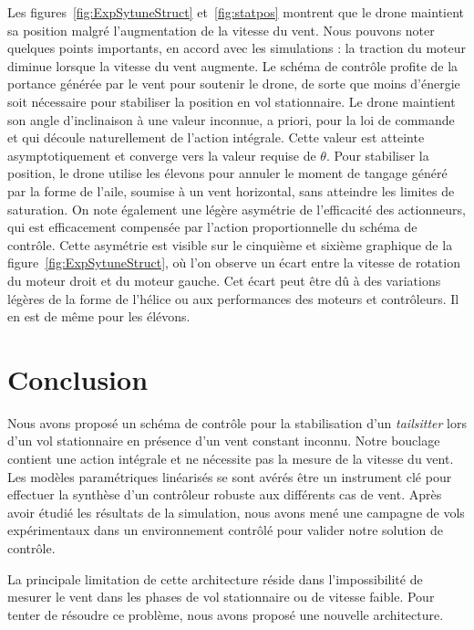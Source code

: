 Les figures~\ref{fig:ExpSytuneStruct} et~\ref{fig:statpos} montrent que le drone maintient sa position malgré l'augmentation de la vitesse du vent. Nous pouvons noter quelques points importants, en accord avec les simulations : la traction du moteur diminue lorsque la vitesse du vent augmente. Le schéma de contrôle profite de la portance générée par le vent pour soutenir le drone, de sorte que moins d'énergie soit nécessaire pour stabiliser la position en vol stationnaire. Le drone maintient son angle d'inclinaison à une valeur inconnue, a priori, pour la loi de commande et qui découle naturellement de l'action intégrale. Cette valeur est atteinte asymptotiquement et converge vers la valeur requise de $\theta$. Pour stabiliser la position, le drone utilise les élevons pour annuler le moment de tangage généré par la forme de l'aile, soumise à un vent horizontal, sans atteindre les limites de saturation.
On note également une légère asymétrie de l'efficacité des actionneurs, qui est efficacement compensée par l'action proportionnelle du schéma de contrôle. Cette asymétrie est visible sur le cinquième et sixième graphique de la figure~\ref{fig:ExpSytuneStruct}, où l'on observe un écart entre la vitesse de rotation du moteur droit et du moteur gauche. Cet écart peut être dû à des variations légères de la forme de l'hélice ou aux performances des moteurs et contrôleurs. Il en est de même pour les élévons.
\section{Conclusion}
Nous avons proposé un schéma de contrôle pour la stabilisation d'un \textit{tailsitter} lors d'un vol stationnaire en présence d'un vent constant inconnu. Notre bouclage contient une action intégrale et ne nécessite pas la mesure de la vitesse du vent. Les modèles paramétriques linéarisés se sont avérés être un instrument clé pour effectuer la synthèse d'un contrôleur robuste aux différents cas de vent. 
Après avoir étudié les résultats de la simulation, nous avons mené une campagne de vols expérimentaux dans un environnement contrôlé pour valider notre solution de contrôle. 

La principale limitation de cette architecture réside dans l'impossibilité de mesurer le vent dans les phases de vol stationnaire ou de vitesse faible. Pour tenter de résoudre ce problème, nous avons proposé une nouvelle architecture.


